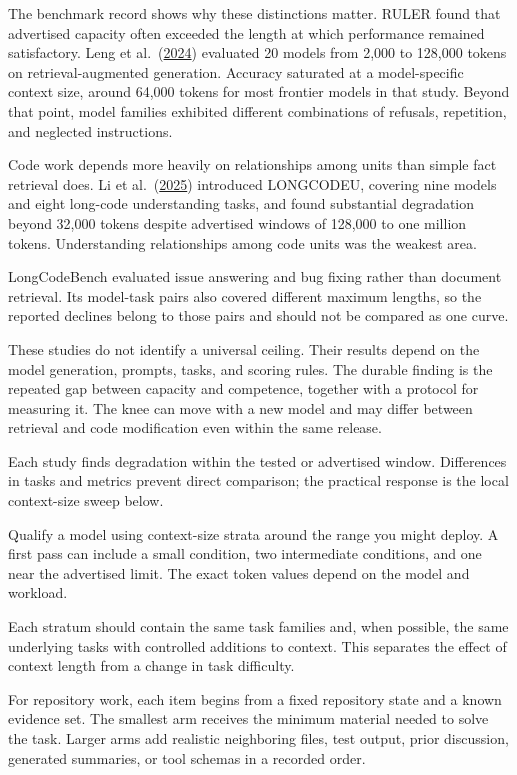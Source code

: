 The benchmark record shows why these distinctions matter. RULER found that advertised capacity often exceeded the length at which performance remained satisfactory. Leng et al.~(\href{https://arxiv.org/abs/2411.03538}{2024}) evaluated 20 models from 2,000 to 128,000 tokens on retrieval-augmented generation. Accuracy saturated at a model-specific context size, around 64,000 tokens for most frontier models in that study. Beyond that point, model families exhibited different combinations of refusals, repetition, and neglected instructions.

Code work depends more heavily on relationships among units than simple fact retrieval does. Li et al.~(\href{https://arxiv.org/abs/2503.04359}{2025}) introduced LONGCODEU, covering nine models and eight long-code understanding tasks, and found substantial degradation beyond 32,000 tokens despite advertised windows of 128,000 to one million tokens. Understanding relationships among code units was the weakest area.

LongCodeBench evaluated issue answering and bug fixing rather than document retrieval. Its model-task pairs also covered different maximum lengths, so the reported declines belong to those pairs and should not be compared as one curve.

These studies do not identify a universal ceiling. Their results depend on the model generation, prompts, tasks, and scoring rules. The durable finding is the repeated gap between capacity and competence, together with a protocol for measuring it. The knee can move with a new model and may differ between retrieval and code modification even within the same release.

Each study finds degradation within the tested or advertised window. Differences in tasks and metrics prevent direct comparison; the practical response is the local context-size sweep below.

Qualify a model using context-size strata around the range you might deploy. A first pass can include a small condition, two intermediate conditions, and one near the advertised limit. The exact token values depend on the model and workload.

Each stratum should contain the same task families and, when possible, the same underlying tasks with controlled additions to context. This separates the effect of context length from a change in task difficulty.

For repository work, each item begins from a fixed repository state and a known evidence set. The smallest arm receives the minimum material needed to solve the task. Larger arms add realistic neighboring files, test output, prior discussion, generated summaries, or tool schemas in a recorded order.

